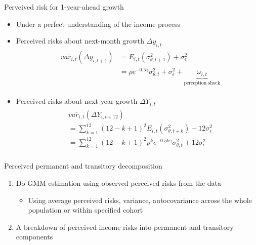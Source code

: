 \documentclass{beamer}
\begin{document}
\begin{frame}{Perveived risk for 1-year-ahead growth}
	\begin{itemize}
		\item Under a perfect understanding of the income process
	\end{itemize}
	\begin{itemize}
		\item Perceived risks about next-month growth $\Delta y_{i,t}$
		\begin{eqnarray*}
			\begin{split}
				& \overline {var_{i,t}}(\Delta y_{i,t+1}) & = E_{i,t}( {\sigma^2_{\theta,t+1}}) + \sigma^2_{\epsilon} \\
				& & = \rho e^{-0.5\gamma} \sigma^2_{\theta,t}  + \sigma^2_{\epsilon} + \underbrace{\omega_{i,t}}_{\text{perception shock}}
			\end{split}
		\end{eqnarray*}
		
		\item Perceived risks about next-year growth $\Delta Y_{i,t}$
		\begin{eqnarray*}
		\begin{split}
			& \overline {var_{i,t}}(\Delta Y_{i,t+12}) \\
			& = \sum^{12}_{k=1} (12-k+1)^2 E_{i,t}( {\sigma^2_{\theta,t+k}}) + 12 \sigma^2_{\epsilon}  \\ 
			& = \sum^{12}_{k=1} (12-k+1)^2 \rho^k e^{-0.5k\gamma} \sigma^2_{\theta,t}+ 12 \sigma^2_{\epsilon} \\ 	 
		\end{split}
	\end{eqnarray*}
	\end{itemize}
\end{frame}

\begin{frame}{Perceived permanent and transitory decomposition}
	\begin{enumerate}
	\item Do GMM estimation using observed perceived risks from the data 
	\begin{itemize}
     \item Using average perceived risks, variance, autocovariance across the whole population or within specified cohort
	\end{itemize}
\item A breakdown of perceived income risks into permanent and transitory components %
\end{enumerate}
\end{frame}
\end{document}
